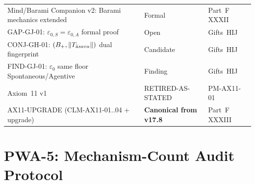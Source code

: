 \documentclass[12pt, a4paper]{article}
\begin{document}
{\begin{longtable}{>{\raggedright\arraybackslash}p{5.5cm}
                  >{\centering\arraybackslash}p{3.0cm}
                  >{\raggedright\arraybackslash}p{3.8cm}}
Mind/Barami Companion v2: Barami mechanics extended &
  Formal & Part~F XXXII \\
GAP-GJ-01: $\varepsilon_{0,S} = \varepsilon_{0,A}$ formal proof &
  Open & Gifts~HIJ \\
CONJ-GH-01: $(B_+, \|T_{\bar{\rm a}sava}\|)$ dual fingerprint &
  Candidate & Gifts~HIJ \\
FIND-GJ-01: $\varepsilon_0$ same floor Spontaneous/Agentive &
  Finding & Gifts~HIJ \\

Axiom~11 v1 & RETIRED-AS-STATED & PM-AX11-01 \\
AX11-UPGRADE (CLM-AX11-01..04 + upgrade) &
  \textbf{Canonical from v17.8} & Part~F XXXIII \\

\end{longtable}
}

\newpage

\section{PWA-5: Mechanism-Count Audit Protocol}
\label{sec:pwa5}
\end{document}
